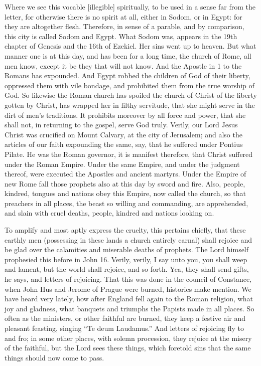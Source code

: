 Where we see this vocable [illegible] spiritually, to be used in a sense far from the letter, for otherwise there is no spirit at all, either in Sodom, or in Egypt: for they are altogether flesh. Therefore, in sense of a parable, and by comparison, this city is called Sodom and Egypt. What Sodom was, appears in the 19th chapter of Genesis and the 16th of Ezekiel. Her sins went up to heaven. But what manner one is at this day, and has been for a long time, the church of Rome, all men know, except it be they that will not know. And the Apostle in 1 to the Romans has expounded. And Egypt robbed the children of God of their liberty, oppressed them with vile bondage, and prohibited them from the true worship of God. So likewise the Roman church has spoiled the church of Christ of the liberty gotten by Christ, has wrapped her in filthy servitude, that she might serve in the dirt of men's traditions. It prohibits moreover by all force and power, that she shall not, in returning to the gospel, serve God truly. Verily, our Lord Jesus Christ was crucified on Mount Calvary, at the city of Jerusalem; and also the articles of our faith expounding the same, say, that he suffered under Pontius Pilate. He was the Roman governor, it is manifest therefore, that Christ suffered under the Roman Empire. Under the same Empire, and under the judgment thereof, were executed the Apostles and ancient martyrs. Under the Empire of new Rome fall those prophets also at this day by sword and fire. Also, people, kindred, tongues and nations obey this Empire, now called the church, so that preachers in all places, the beast so willing and commanding, are apprehended, and slain with cruel deaths, people, kindred and nations looking on.

To amplify and most aptly express the cruelty, this pertains chiefly, that these earthly men (possessing in these lands a church entirely carnal) shall rejoice and be glad over the calamities and miserable deaths of prophets. The Lord himself prophesied this before in John 16. Verily, verily, I say unto you, you shall weep and lament, but the world shall rejoice, and so forth. Yea, they shall send gifts, he says, and letters of rejoicing. That this was done in the council of Constance, when John Hus and Jerome of Prague were burned, histories make mention. We have heard very lately, how after England fell again to the Roman religion, what joy and gladness, what banquets and triumphs the Papists made in all places. So often as the ministers, or other faithful are burned, they keep a festive air and pleasant feasting, singing “Te deum Laudamus.” And letters of rejoicing fly to and fro; in some other places, with solemn procession, they rejoice at the misery of the faithful, but the Lord sees these things, which foretold sins that the same things should now come to pass.

